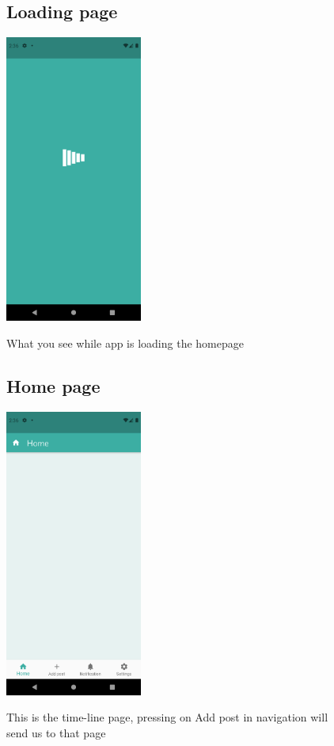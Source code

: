 \documentclass[12pt]{article}
\begin{document}
\begin{figure}[h!]
  \subsection*{Loading page}
{\includegraphics[width=0.4\textwidth]{./Screenshots/9.PNG}}
  \caption{What you see while app is loading the homepage}
  \end{figure}


\begin{figure}[t!]
  \subsection*{Home page}
{\includegraphics[width=0.4\textwidth]{./Screenshots/10.PNG}}
  \caption{This is the time-line page, pressing on Add post in navigation will send us to that page}
  \end{figure}
\end{document}
